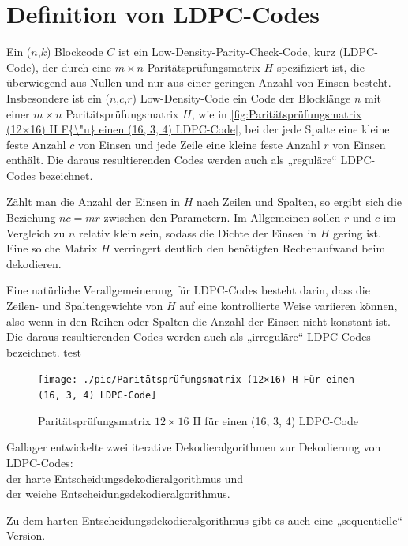 \chapter{Definition von LDPC-Codes}
\begin{definition}
    Ein (\(n\),\(k\)) Blockcode \(C\) ist ein Low-Density-Parity-Check-Code, kurz (LDPC-Code), der durch eine $m \times n$ Paritätsprüfungsmatrix $H$ 
    spezifiziert ist, die überwiegend aus Nullen und nur aus einer geringen Anzahl von Einsen besteht. 
    Insbesondere ist ein (\(n\),\(c\),\(r\)) Low-Density-Code ein Code der Blocklänge $n$ mit einer $m \times n$ Paritätsprüfungsmatrix $H$,
    wie in \autoref{fig:Paritätsprüfungsmatrix (12×16) H F{\"u} einen (16, 3, 4) LDPC-Code}, 
    bei der jede Spalte eine kleine feste Anzahl $c$ von Einsen und jede Zeile eine kleine feste Anzahl $r$ von Einsen enthält.
    Die daraus resultierenden Codes werden auch als „reguläre“ LDPC-Codes bezeichnet.
    
    Zählt man die Anzahl der Einsen in $H$ nach Zeilen und Spalten, so ergibt sich die Beziehung $nc = mr$ zwischen den Parametern. Im Allgemeinen sollen $r$ und $c$ im Vergleich zu $n$ relativ klein sein, sodass die Dichte der Einsen in $H$ gering ist. Eine solche Matrix $H$ verringert deutlich den benötigten Rechenaufwand beim dekodieren.
    
    Eine natürliche Verallgemeinerung für LDPC-Codes besteht darin, dass die Zeilen- und Spaltengewichte von $H$ auf eine kontrollierte Weise variieren können, also wenn in den Reihen oder Spalten die Anzahl der Einsen nicht konstant ist. Die daraus resultierenden Codes werden auch als „irreguläre“ LDPC-Codes bezeichnet.
test
    
    \begin{figure}[!ht]
        \centering
         {\texttt{[image: ./pic/Paritätsprüfungsmatrix (12×16) H Für einen (16, 3, 4) LDPC-Code]}}
          \caption{ Paritätspr{\"u}fungsmatrix \(12\times16\) H für einen (16, 3, 4) LDPC-Code}
        \label{fig:Paritätsprüfungsmatrix (12×16) H F{\"u} einen (16, 3, 4) LDPC-Code}
    \end{figure}
    
    
     Gallager entwickelte zwei iterative Dekodieralgorithmen zur Dekodierung von LDPC-Codes:\\
     der harte Entscheidungsdekodieralgorithmus und\\
     der weiche Entscheidungsdekodieralgorithmus.
    
     Zu dem harten Entscheidungsdekodieralgorithmus gibt es auch eine „sequentielle“ Version.
    \cite[S. 11]{huffman}
\end{definition}
\pagebreak
    
